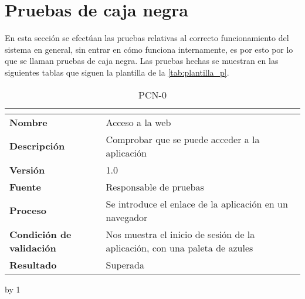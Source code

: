 \section{Pruebas de caja negra}
En esta sección se efectúan las pruebas relativas al correcto funcionamiento del sistema en general, sin entrar en cómo funciona internamente, es por esto por lo que se llaman pruebas de caja negra. Las pruebas hechas se muestran en las siguientes tablas que siguen la plantilla de la \autoref{tab:plantilla_p}.

\newcount\pcn
{}
\begin{table}[H]
	\caption{PCN-0\number\pcn}
	\begin{tabular}{|l|p{}|}
		\hline
		\multicolumn{2}{|c|}{\cellcolor[HTML]{BFBFBF}{\color[HTML]{000000} \textbf{PCN-0\number\pcn}}} \\ \hline
		\textbf{Nombre}                  & Acceso a la web                                                            \\ \hline
		\textbf{Descripción}             & Comprobar que se puede acceder a la aplicación                             \\ \hline
		\textbf{Versión}                 & 1.0                                                                        \\ \hline
		\textbf{Fuente}                  & Responsable de pruebas                                                     \\ \hline
		\textbf{Proceso}                 & Se introduce el enlace de la aplicación en un navegador                    \\ \hline
		\textbf{Condición de validación} & Nos muestra el inicio de sesión de la aplicación, con una paleta de azules \\ \hline
		\textbf{Resultado}               & Superada                                                                   \\ \hline
	\end{tabular}
\end{table}
\advance\pcn by 1
